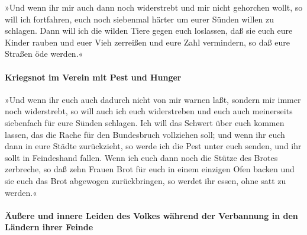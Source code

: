 »Und wenn ihr mir auch dann noch widerstrebt und mir
nicht gehorchen wollt, so will ich fortfahren, euch noch siebenmal
härter um eurer Sünden willen zu schlagen. Dann will ich
die wilden Tiere gegen euch loslassen, daß sie euch eure Kinder rauben
und euer Vieh zerreißen und eure Zahl vermindern, so daß eure Straßen
öde werden.«

\hypertarget{kriegsnot-im-verein-mit-pest-und-hunger}{%
\paragraph{Kriegsnot im Verein mit Pest und
Hunger}\label{kriegsnot-im-verein-mit-pest-und-hunger}}

»Und wenn ihr euch auch dadurch nicht von mir warnen
laßt, sondern mir immer noch widerstrebt, so will auch
ich euch widerstreben und euch auch meinerseits siebenfach für eure
Sünden schlagen. Ich will das Schwert über euch kommen
lassen, das die Rache für den Bundesbruch vollziehen soll; und wenn ihr
euch dann in eure Städte zurückzieht, so werde ich die Pest unter euch
senden, und ihr sollt in Feindeshand fallen. Wenn ich
euch dann noch die Stütze des Brotes zerbreche, so daß zehn Frauen Brot
für euch in einem einzigen Ofen backen und sie euch das Brot abgewogen
zurückbringen, so werdet ihr essen, ohne satt zu werden.«

\hypertarget{uxe4uuxdfere-und-innere-leiden-des-volkes-wuxe4hrend-der-verbannung-in-den-luxe4ndern-ihrer-feinde}{%
\paragraph{Äußere und innere Leiden des Volkes während der Verbannung in
den Ländern ihrer
Feinde}\label{uxe4uuxdfere-und-innere-leiden-des-volkes-wuxe4hrend-der-verbannung-in-den-luxe4ndern-ihrer-feinde}}

